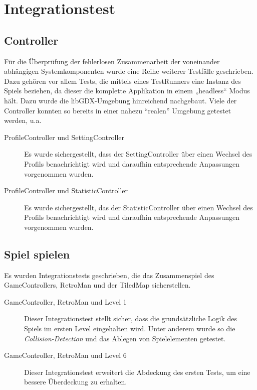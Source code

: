 \documentclass[parskip=full]{scrreprt}
\begin{document}
\section{Integrationstest}

\subsection{Controller}

Für die Überprüfung der fehlerlosen Zusammenarbeit der voneinander abhängigen Systemkomponenten wurde eine Reihe weiterer Testfälle geschrieben. Dazu gehören vor allem Tests, die mittels eines TestRunners eine Instanz des Spiels beziehen, da dieser die komplette Applikation in einem „headless“ Modus hält. Dazu wurde die libGDX-Umgebung hinreichend nachgebaut. Viele der Controller konnten so bereits in einer nahezu \enquote{realen} Umgebung getestet werden, u.a.

\begin{description}
	\item[ProfileController und SettingController] Es wurde sichergestellt, dass der SettingController über einen Wechsel des Profils benachrichtigt wird und daraufhin entsprechende Anpassungen vorgenommen wurden.
	\item[ProfileController und StatisticController] Es wurde sichergestellt, das der StatisticController über einen Wechsel des Profils benachrichtigt wird und daraufhin entsprechende Anpassungen vorgenommen wurden.
\end{description}

\subsection{Spiel spielen}

Es wurden Integrationstests geschrieben, die das Zusammenspiel des GameControllers, RetroMan und der TiledMap sicherstellen.

\begin{description}
	\item[GameController, RetroMan und Level 1] Dieser Integrationstest stellt sicher, dass die grundsätzliche Logik des Spiels im ersten Level eingehalten wird. Unter anderem wurde so die \textit{Collision-Detection} und das Ablegen von Spielelementen getestet.
	\item[GameController, RetroMan und Level 6] Dieser Integrationstest erweitert die Abdeckung des ersten Tests, um eine bessere Überdeckung zu erhalten.
\end{description}
\end{document}
